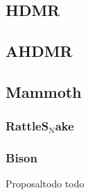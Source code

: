 \documentclass{beamer}
\begin{document}
\subsection{HDMR}
\subsection{AHDMR}
\subsection{Mammoth}
\subsubsection{RattleS$_\text{N}$ake}
\subsubsection{Bison}

\begin{frame}{Proposal}{todo}
  todo
\end{frame}
\end{document}
